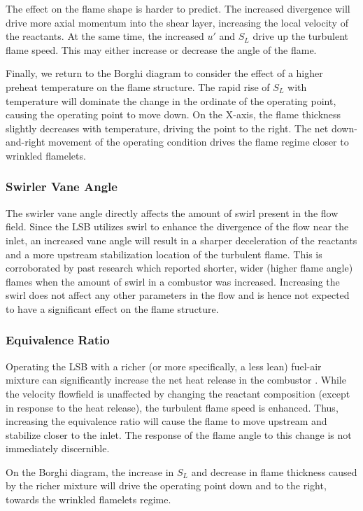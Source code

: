 The effect on the flame shape is harder to predict.
The increased divergence will drive more axial momentum into the shear layer, increasing the local velocity of the reactants.
At the same time, the increased \(u'\) and \(S_L\) drive up the turbulent flame speed.
This may either increase or decrease the angle of the flame.

Finally, we return to the Borghi diagram to consider the effect of a higher preheat temperature on the flame structure.
The rapid rise of \(S_L\) with temperature will dominate the change in the ordinate of the operating point, causing the operating point to move down.
On the X-axis, the flame thickness slightly decreases with temperature, driving the point to the right.
The net down-and-right movement of the operating condition drives the flame regime closer to wrinkled flamelets.

\subsubsection{Swirler Vane Angle}

The swirler vane angle directly affects the amount of swirl present in the flow field.
Since the LSB utilizes swirl to enhance the divergence of the flow near the inlet, an increased vane angle will result in a sharper deceleration of the reactants and a more upstream stabilization location of the turbulent flame.
This is corroborated by past research\cite{1986-starner} which reported shorter, wider (higher flame angle) flames when the amount of swirl in a combustor was increased.
Increasing the swirl does not affect any other parameters in the flow and is hence not expected to have a significant effect on the flame structure.

\subsubsection{Equivalence Ratio}

Operating the LSB with a richer (or more specifically, a less lean) fuel-air mixture can significantly increase the net heat release in the combustor .
While the velocity flowfield is unaffected by changing the reactant composition (except in response to the heat release), the turbulent flame speed is enhanced.
Thus, increasing the equivalence ratio will cause the flame to move upstream and stabilize closer to the inlet.
The response of the flame angle to this change is not immediately discernible.

On the Borghi diagram, the increase in \(S_L\) and decrease in flame thickness caused by the richer mixture will drive the operating point down and to the right, towards the wrinkled flamelets regime.

